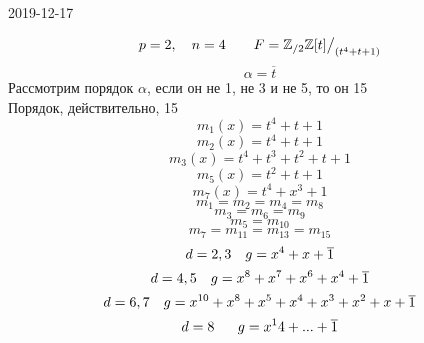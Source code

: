 \documentclass[12pt, fleqn]{article}
\begin{document}
\begin{lect}{2019-12-17}
    \begin{Example}
        \[p = 2, \quad n = 4 \qquad F = \mathbb{Z}_{/2}\mathbb{Z}[t]\big/_{(t^4 + t + 1)}  \]
        \[\alpha = \overline{t}\]
        Рассмотрим порядок $\alpha$, если он не 1, не 3 и не 5, то он 15\\
        Порядок, действительно, 15
        \[m_1(x) = t^4  + t + 1\]
        \[m_2(x) = t^4 + t + 1\]
        \[m_3(x) = t^4 + t^3 + t^2 + t + 1\]
        \[m_5(x) = t^2 + t + 1\]
        \[m_{7}(x) = t^4 + x^3 + 1 \]
        \[m_1 = m_2 = m_4 = m_8 \]
        \[m_3 = m_6 = m_9\]
        \[m_5 = m_{10} \]
        \[m_7 = m_{11}  = m_{13}  = m_{15} \]
        \[d = 2, 3 \quad g = x^4 + x + \overline{1}\]
        \[d = 4, 5 \quad g = x^8 + x^7 + x^6 + x^4 + \overline{1}\]
        \[d = 6, 7 \quad g = x^{10} + x^8 + x^5 + x^4 + x^3 + x^2 + x + \overline{1} \]
        \[d = 8 \ \ \quad g = x^14 + ... + \overline{1}\]
    \end{Example}
\end{lect}
\end{document}
